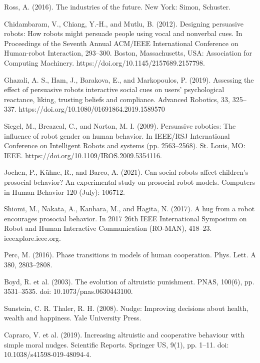 \documentclass[runningheads]{llncs}
\begin{document}
\begin{thebibliography}{8}

Ross, A. (2016). The industries of the future. New York: Simon, Schuster. 

Chidambaram, V., Chiang, Y.-H., and Mutlu, B. (2012). Designing persuasive robots: How robots might persuade people using vocal and nonverbal cues. In Proceedings of the Seventh Annual ACM/IEEE International Conference on Human-robot Interaction, 293–300. Boston, Massachusetts, USA: Association for Computing Machinery. https://doi.org/10.1145/2157689.2157798.

Ghazali, A. S., Ham, J., Barakova, E., and Markopoulos, P. (2019). Assessing the effect of persuasive robots interactive social cues on users' psychological reactance, liking, trusting beliefs and compliance. Advanced Robotics, 33, 325–337. https://doi.org/10.1080/01691864.2019.1589570 

Siegel, M., Breazeal, C., and Norton, M. I. (2009). Persuasive robotics: The influence of robot gender on human behavior. In IEEE/RSJ International Conference on Intelligent Robots and systems (pp. 2563–2568). St. Louis, MO: IEEE. https://doi.org/10.1109/IROS.2009.5354116. 

Jochen, P., Kühne, R., and Barco, A. (2021). Can social robots affect children's prosocial behavior? An experimental study on prosocial robot models. Computers in Human Behavior 120 (July): 106712.

Shiomi, M., Nakata, A., Kanbara, M., and Hagita, N. (2017). A hug from a robot encourages prosocial behavior. In 2017 26th IEEE International Symposium on Robot and Human Interactive Communication (RO-MAN), 418–23. ieeexplore.ieee.org.

Perc, M. (2016). Phase transitions in models of human cooperation. Phys. Lett. A 380, 2803–2808.

Boyd, R. et al. (2003). The evolution of altruistic punishment. PNAS, 100(6), pp. 3531–3535. doi: 10.1073/pnas.0630443100.

Sunstein, C. R. Thaler, R. H. (2008). Nudge: Improving decisions about health, wealth and happiness. Yale University Press.

Capraro, V. et al. (2019). Increasing altruistic and cooperative behaviour with simple moral nudges. Scientific Reports. Springer US, 9(1), pp. 1–11. doi: 10.1038/s41598-019-48094-4.


\end{thebibliography}
\end{document}
